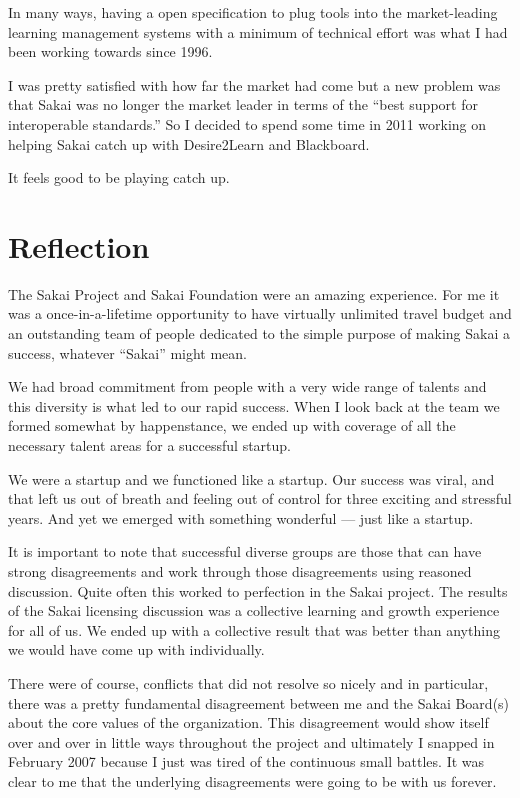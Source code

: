 \documentclass[12pt]{book}
\begin{document}
In many ways, having a open specification to plug tools
into the market-leading learning management systems with a minimum
of technical effort was what I had been working towards since 1996.

I was pretty satisfied with how far the market had come but a new problem
was that Sakai was no longer the market leader in terms of the
``best support for interoperable standards.''   So I decided to spend
some time in 2011 working on helping Sakai catch up with Desire2Learn
and Blackboard.

It feels good to be playing catch up.

\chapter{Reflection}

The Sakai Project and Sakai Foundation were an amazing experience.
For me it was a once-in-a-lifetime opportunity to have virtually
unlimited travel budget and an outstanding team of people
dedicated to the simple purpose of making Sakai a success,
whatever ``Sakai'' might mean.

We had broad commitment from people with a very wide range of
talents and this diversity is what led to our rapid success.
When I look back at the team we formed somewhat by happenstance,
we ended up with coverage of all the necessary talent areas for
a successful startup.

We were a startup and we functioned like a startup.  Our success
was viral, and that left us out of breath and feeling out of
control for three exciting and stressful years.   And yet we
emerged with something wonderful --- just like a startup.

It is important to note that successful diverse groups are those
that can have strong disagreements and work through those
disagreements using reasoned discussion.  Quite often this worked
to perfection in the Sakai project.  The results
of the Sakai licensing discussion was a collective learning and
growth experience for all of us.  We ended up with
a collective result that was better than anything we would have come
up with individually.

There were of course, conflicts that did not resolve so nicely
and in particular, there was a pretty fundamental disagreement
between me and the Sakai Board(s) about the core values of
the organization.  This disagreement would show itself over and
over in little ways throughout the project and ultimately
I snapped in February 2007 because I just was tired of
the continuous small battles.  It was clear to me that the underlying
disagreements were going to be with us forever.
\end{document}
